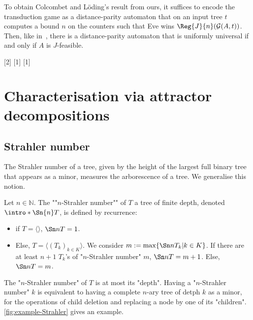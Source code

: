 \documentclass[a4paper,UKenglish,cleveref, autoref, thm-restate]{lipics-v2021}
\newcommand{\NN}{\mathbb{N}}
\newcommand{\F}{\mathcal{F}}
\newcommand{\G}{\mathcal{G}}
\begin{document}
\begin{remark}\label{rmk:colcombet-loding}
To obtain Colcombet and L\"oding's result from ours, it suffices to encode the transduction game as a distance-parity automaton that on an input tree $t$ computes a bound $n$ on the counters such that Eve wins  $\Reg{J}{n}(\G(A,t))$. Then, like in~\cite[Lemma 3]{Guidable}, there is a distance-parity automaton that is uniformly universal if and only if $A$ is $J$-feasible.
\end{remark}  


\knowledgenewcommand{\Sn}[2]{}
\knowledgenewcommand{\Fo}{\cmdkl{\F}}
\knowledgenewcommand{\mapV}[1]{}
\knowledgenewcommand{\mapE}[1]{}



\section{Characterisation via attractor decompositions}\label{sec:strahler}

\subsection{Strahler number}

The Strahler number of a tree, given by the height of the largest full binary tree that appears as a minor, measures the arborescence of a tree. We generalise this notion.

\AP Let $n\in \NN$. The ""$n$-Strahler number"" of $T$ a tree of finite depth, denoted $\intro*\Sn{n}T$, is defined by recurrence:
\begin{itemize}
	\item if $T = \langle \rangle$, $\Sn n T=1$.
	\item Else, $T = \langle (T_k)_{k\in K}\rangle$. We consider $m := \max\{\Sn n {T_k}|k \in K\}$. If there are at least $n+1$ $T_k$'s of "$n$-Strahler number" $m$, $\Sn n T = m+1$. Else, $\Sn n T = m$.
\end{itemize}
The "$n$-Strahler number" of $T$ is at most its "depth". Having a "$n$-Strahler number" $k$ is equivalent to having a complete $n$-ary tree of detph $k$ as a minor, for the operations of child deletion and replacing a node by one of its "children".  \cref{fig:example-Strahler} gives an example.
\end{document}
